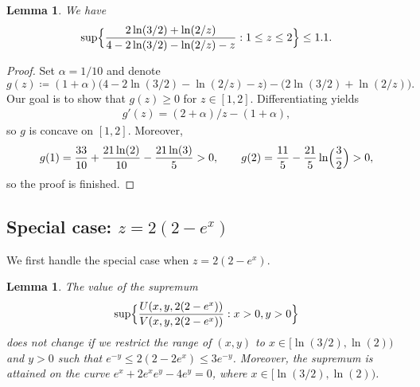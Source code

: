 \documentclass[a4paper]{amsart} %
\newtheorem{lemma}[theorem]{Lemma}
\theoremstyle{definition}
\theoremstyle{remark}
\numberwithin{equation}{section}
\newcommand*{\XXXasymptoticDenominator}{V}
\newcommand*{\XXXasymptoticNominator}{U}
\begin{document}
\begin{lemma}
	\label{lem:asymptotic-push-case-2.1.1-no-y-x=ln3/2}
	We have
	\begin{equation*}
	\sup \Bigl\{ \frac{2 \ln(3/2) + \ln(2/z)}{4 -  2\ln(3/2) - \ln(2/z) -z} : 1\leq z\leq 2 \Bigr\} \leq 1.1.
	\end{equation*}
\end{lemma}

\begin{proof}
	Set $\alpha = 1/10$ and denote
	\begin{equation*}
	g(z) \coloneqq (1+\alpha)\bigl(4 -  2\ln(3/2) - \ln(2/z) -z\bigr)  - \bigl(2 \ln(3/2) + \ln(2/z)\bigl).
	\end{equation*}
	Our goal is to show that $g(z) \geq 0$ for $z\in [1,2]$. 
	Differentiating  yields
	\begin{align*}
	g'(z)  = (2+\alpha)/z - (1+\alpha),
	\end{align*}
	so $g$ is concave on $[1,2]$. Moreover, 
	\[
	g(1) = \frac{33}{10} + \frac{21\ln(2)}{10} - \frac{21\ln(3)}{5} > 0, \qquad
	g(2) = \frac{11}{5} - \frac{21}{5} \ln \Bigl(\frac{3}{2}\Bigr)> 0,
	\]
	so the proof is finished.
\end{proof}

\subsection{Special case: \texorpdfstring{$z = 2(2-e^x)$}{z=2(2-exp(x))}}

We first handle the special case when $z=2(2-e^x)$.


\begin{lemma}
	\label{lem:asymptotic-push-case-0}
	The value of the supremum
	\[
	\sup \Bigl\{ \frac{\XXXasymptoticNominator(x,y,2(2-e^x))}{\XXXasymptoticDenominator(x,y,2(2-e^x))} : x>0, y>0\Bigr\}
	\]
    does not change if we restrict the range of $(x,y)$ to $x\in[\ln(3/2), \ln(2))$ and $y>0$ such that $e^{-y} \leq 2(2-2e^x) \leq 3e^{-y}$.
    Moreover, the supremum is attained on the curve
     $e^x  +2 e^x e^{y} - 4e^{y} = 0$, where $x\in [\ln(3/2), \ln(2))$.
\end{lemma}
\end{document}

